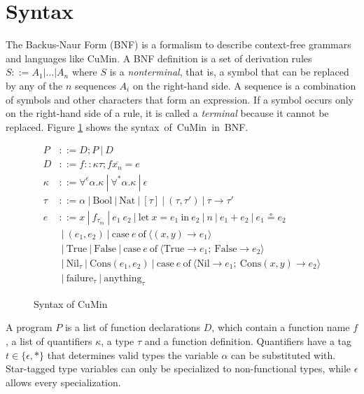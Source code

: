 \documentclass[paper = a4, fleqn, twoside]{scrreprt}
\begin{document}
\section{Syntax}
The Backus-Naur Form (BNF) is a formalism to describe context-free grammars and languages like CuMin. A BNF definition is a set of derivation rules $S ::= A_{1} | \dots | A_{n} $ where $S$ is a \textit{nonterminal}, that is, a symbol that can be replaced by any of the $n$ sequences $A_{i}$ on the right-hand side. A sequence is a combination of symbols and other characters that form an expression. If a symbol occurs only on the right-hand side of a rule, it is called a \textit{terminal} because it cannot be replaced. Figure \ref{cumin:syntax} shows the \mbox{syntax of CuMin in BNF.}
\vspace*{-1em}
\begin{figure}[H]
\begin{align*}
P &::= D;P \:|\:D \\
D &::= f :: \kappa \tau; f \overline{x_{n}} = e\\
\kappa &::= \forall^{\epsilon} \alpha.\kappa \:|\: \forall^{*}\alpha.\kappa \:|\: \epsilon \\
\tau &::= \alpha \:|\: \text{Bool} \:|\: \text{Nat} \:|\: [\tau] \:|\: (\tau,\tau ') \:|\: \tau \rightarrow \tau ' \\
e &::= x \:|\: f_{\overline{\tau_{m}}} \:|\: e_{1}\: e_{2} \:|\: \text{let}\: x = e_{1} \:\text{in}\: e_{2} \:|\: n \:|\: e_{1} + e_{2} \:|\: e_{1} \circeq e_{2}\\
&\:|\: (e_{1},e_{2}) \:|\: \text{case}\: e \:\text{of}\: \langle (x,y) \rightarrow e_{1}\rangle\\
&\:|\: \text{True} \:|\: \text{False} \:|\: \text{case}\: e \:\text{of}\: \langle \text{True} \rightarrow e_{1};\:\text{False} \rightarrow e_{2}\rangle\\
&\:|\: \text{Nil}_{\tau} \:|\: \text{Cons}(e_{1}, e_{2}) \:|\: \text{case}\: e \:\text{of}\: \langle \text{Nil} \rightarrow e_{1};\:\text{Cons}(x,y) \rightarrow e_{2}\rangle\\
&\:|\: \text{failure}_{\tau} \:|\: \text{anything}_{\tau}
\end{align*}
\vspace*{-1.5em}
\caption{Syntax of CuMin}
\label{cumin:syntax}
\end{figure}
\noindent
A program $P$ is a list of function declarations $D$, which contain a function name $f$, a list of quantifiers $\kappa$, a type $\tau$ and a function definition. Quantifiers have a tag \mbox{$t \in \{\epsilon, *\}$} that determines valid types the variable $\alpha$ can be substituted with. Star-tagged type variables can only be specialized to non-functional types, while $\epsilon$ allows every specialization.
\end{document}
